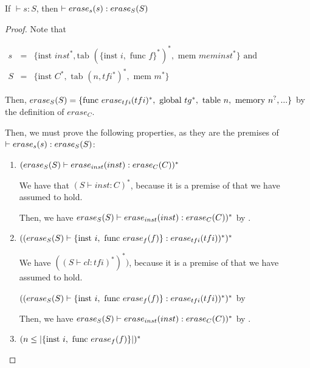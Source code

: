 \begin{lemma}{}
    If $\vdash s : S$, then $\vdash \erase[s]{s} : \erase[S]{S}$
\end{lemma}
\begin{proof}

    Note that

    \begin{math}
        \begin{array}{rcl}
            s &=& \{\text{inst } inst^{*}, \text{tab } (\{\text{inst } i, \text{ func } f\}^{*})^{*}, \text{ mem } meminst^{*}\} \text{ and}\\
            S &=& \{\text{inst } C^{*}, \text{ tab } (n,tfi^{*})^{*}, \text{ mem } m^{*}\}
        \end{array}
    \end{math}

    Then, $\erase[S]{S}=\{\text{func } \erase[tfi]{tfi}^{*}, \text{ global } tg^{*}, \text{ table } n, \text{ memory } n^{?}, ...\}$ by the definition of $erase_C$.

    Then, we must prove the following properties, as they are the premises of $\vdash \erase[s]{s} : \erase[S]{S}$:
    \begin{enumerate}
        \item $(\erase[S]{S} \vdash \erase[inst]{inst} : \erase[C]{C})^{*}$

        We have that $(S \vdash inst : C)^{*}$, because it is a premise of  that we have assumed to hold.

        Then, we have $\erase[S]{S} \vdash \erase[inst]{inst} : \erase[C]{C})^{*}$ by .

        \item $((\erase[S]{S} \vdash \{\text{inst } i, \text{ func } \erase[f]{f}\} : \erase[tfi]{tfi})^{*})^{*}$

        We have $((S \vdash cl :  tfi)^{*})^{*})$, because it is a premise of  that we have assumed to hold.

        $((\erase[S]{S} \vdash \{\text{inst } i, \text{ func } \erase[f]{f}\} : \erase[tfi]{tfi})^{*})^{*}$ by 

        Then, we have $\erase[S]{S} \vdash \erase[inst]{inst} : \erase[C]{C})^{*}$ by .

        \item $(n \leq |\{\text{inst } i, \text{ func } \erase[f]{f}\}|)^{*}$


\end{enumerate}
\end{proof}
